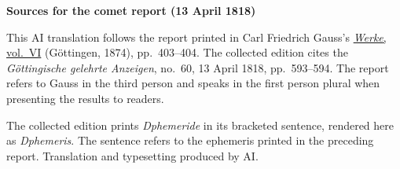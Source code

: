 \clearpage\thispagestyle{empty}
\begin{center}\textbf{Sources for the comet report (13 April 1818)}\end{center}
\noindent This AI translation follows the report printed in Carl Friedrich Gauss’s \href{https://gdz.sub.uni-goettingen.de/id/PPN236007467}{\textit{Werke}, vol.~VI} (Göttingen, 1874), pp.~403--404. The collected edition cites the \textit{Göttingische gelehrte Anzeigen}, no.~60, 13 April 1818, pp.~593--594. The report refers to Gauss in the third person and speaks in the first person plural when presenting the results to readers.
\par\smallskip\noindent The collected edition prints \textit{Dphemeride} in its bracketed sentence, rendered here as \textit{Dphemeris}. The sentence refers to the ephemeris printed in the preceding report. Translation and typesetting produced by AI.
\clearpage
